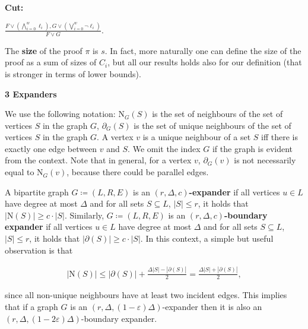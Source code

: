 \documentclass[10pt,a4paper]{article}
\begin{document}
\textbf{Cut:}



$\frac{F\vee(\bigwedge\limits_{i=0}^{w}\ell_{i}),G\vee(\bigvee\limits_{i=0}^{w}%
\neg\ell_{i})}{F\vee G}$.\par








The \textbf{size} of the proof $\pi$ is $s$. In fact, more naturally one can define the size of the
proof as a sum of sizes of $C_{i}$, but all our results holds also for our definition (that is stronger in
terms of lower bounds).\par






\par\medskip\noindent\textbf{
3 Expanders}\par




We use the following notation: $\mathrm{N}_{G}\left(S\right)$ is the set of neighbours of the set of vertices $S$ in the
graph $G$, $\partial_{G}(S)$ is the set of unique neighbours of the set of vertices $S$ in the graph $G$.
A vertex $v$ is a unique neighbour of a set $S$ iff there is exactly one edge between $v$ and $S$. We
omit the index $G$ if the graph is evident from the context. Note that in general, for a vertex $v$,
$\partial_{G}(v)$ is not necessarily equal to $\mathrm{N}_{G}\left(v\right)$, because there could be parallel edges.\par




A bipartite graph $G\coloneqq(L,R,E)$ is an $(r,\Delta,c)$\textbf{-expander} if all vertices $u\in L$ have degree at most $\Delta$ and for all sets $S\subseteq L$, $|S|\leq r$, it holds that
$|\mathrm{N}\left(S\right)|\geq c\cdot|S|$. Similarly, $G\coloneqq(L,R,E)$ is an
$(r,\Delta,c)$\textbf{-boundary expander} if all vertices $u\in L$ have degree at most $\Delta$ and
for all sets $S\subseteq L$, $|S|\leq r$, it holds that $|\partial(S)|\geq c\cdot|S|$. In this context,
a simple but useful observation is that\par


\[\begin{gathered}
|\mathrm{N}\left(S\right)|\leq|\partial(S)|+\frac{\Delta|S|-|\partial(S)|}{2}=%
\frac{\Delta|S|+|\partial(S)|}{2},
\end{gathered}\]


since all non-unique neighbours have at least two incident edges. This implies that if a graph $G$ is an
$(r,\Delta,(1-\varepsilon)\Delta)$-expander then it is also an $(r,\Delta,(1-2\varepsilon)\Delta)$-boundary expander.\par
\end{document}
